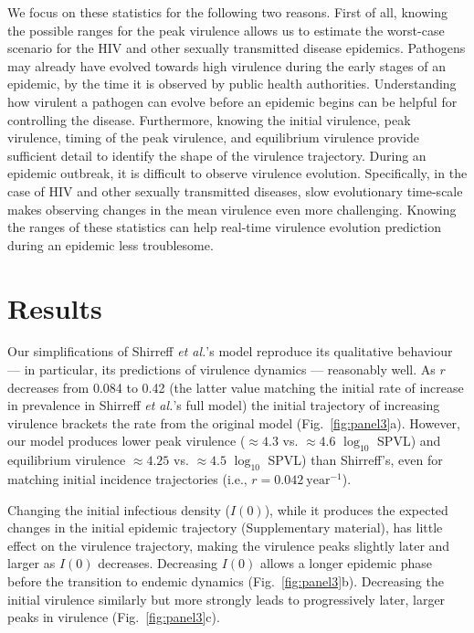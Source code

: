\documentclass[10pt,letterpaper]{article}
\newcommand{\Lspvl}{$\log_{10}$ SPVL}
\newcommand{\etal}{\textit{et al.}}
\begin{document}
We focus on these statistics for the following two reasons. First of all, knowing the possible ranges for the peak virulence allows us to estimate the worst-case scenario for the HIV and other sexually transmitted disease epidemics. Pathogens may already have evolved towards high virulence during the early stages of an epidemic, by the time it is observed by public health authorities. Understanding how virulent a pathogen can evolve before an epidemic begins can be helpful for controlling the disease. Furthermore, knowing the initial virulence, peak virulence, timing of the peak virulence, and equilibrium virulence provide sufficient detail to identify the shape of the virulence trajectory. During an epidemic outbreak, it is difficult to observe virulence evolution. Specifically, in the case of HIV and other sexually transmitted diseases, slow evolutionary time-scale makes observing changes in the mean virulence even more challenging. Knowing the ranges of these statistics can help real-time virulence evolution prediction during an epidemic less troublesome.

\section*{Results}

Our simplifications of Shirreff \etal's model \cite{shirreff_transmission_2011} reproduce its qualitative behaviour --- in particular, its predictions of virulence dynamics --- reasonably well. As $r$ decreases from 0.084 to 0.42 (the latter value matching the initial rate of increase in prevalence in Shirreff \etal's full model) the initial trajectory of increasing virulence brackets the rate from the original model (Fig.~\ref{fig:panel3}a). However, our model produces lower peak virulence ($\approx 4.3$ vs. $\approx 4.6$ \Lspvl) 
and equilibrium virulence $\approx 4.25$ vs. $\approx 4.5$ \Lspvl) than Shirreff's, even for matching initial incidence trajectories (i.e., $r=0.042~\textrm{year}^{-1}$).

Changing the initial infectious density ($I(0)$), while it produces the expected changes in the initial epidemic trajectory (Supplementary material), has little effect on the virulence trajectory, making the virulence peaks slightly later and larger as $I(0)$ decreases. Decreasing $I(0)$ allows a longer epidemic phase before the transition to endemic dynamics (Fig.~\ref{fig:panel3}b). Decreasing the initial virulence similarly but more strongly leads to progressively later, larger peaks in virulence (Fig.~\ref{fig:panel3}c).
\end{document}
